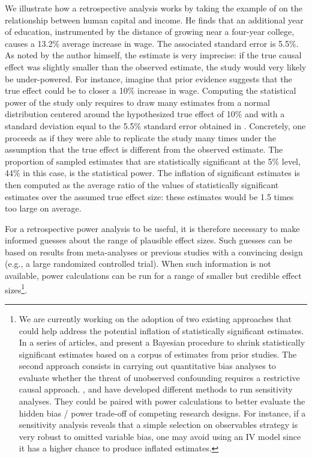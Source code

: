 \documentclass[12pt]{article}
\begin{document}
    We illustrate how a retrospective analysis works by taking the example of \cite{card_using_1993} on the relationship between human capital and income. He finds that an additional year of education, instrumented by the distance of growing near a four-year college, causes a 13.2\% average increase in wage. The associated standard error is 5.5\%. As noted by the author himself, the estimate is very imprecise: if the true causal effect was slightly smaller than the observed estimate, the study would very likely be under-powered. For instance, imagine that prior evidence suggests that the true effect could be to closer a 10\% increase in wage. Computing the statistical power of the study only requires to draw many estimates from a normal distribution centered around the hypothesized true effect of 10\% and with a standard deviation equal to the 5.5\% standard error obtained in \cite{card_using_1993}. Concretely, one proceeds as if they were able to replicate the study many times under the assumption that the true effect is different from the observed estimate. The proportion of sampled estimates that are statistically significant at the 5\% level, 44\% in this case, is the statistical power. The inflation of significant estimates is then computed as the average ratio of the values of statistically significant estimates over the assumed true effect size: these estimates would be 1.5 times too large on average. 
    
    For a retrospective power analysis to be useful, it is therefore necessary to make informed guesses about the range of plausible effect sizes. Such guesses can be based on results from meta-analyses or previous studies with a convincing design (e.g., a large randomized controlled trial). When such information is not available, power calculations can be run for a range of smaller but credible effect sizes\footnote{We are currently working on the adoption of two existing approaches that could help address the potential inflation of statistically significant estimates. 
    In a series of articles, \cite{zwet_proposal_2021, zwet_significance_2021} and \cite{zwet_statistical_2021} present a Bayesian procedure to shrink statistically significant estimates based on a corpus of estimates from prior studies.
    The second approach consists in carrying out quantitative bias analyses to evaluate whether the threat of unobserved confounding requires a restrictive causal approach. \cite{rosenbaum_observational_2002}, \cite{oster_unobservable_2019} and \cite{cinelli_making_2020} have developed different methods to run sensitivity analyses. They could be paired with power calculations to better evaluate the hidden bias / power trade-off of competing research designs. For instance, if a sensitivity analysis reveals that a simple selection on observables strategy is very robust to omitted variable bias, one may avoid using an IV model since it has a higher chance to produce inflated estimates.}.
    
\end{document}
